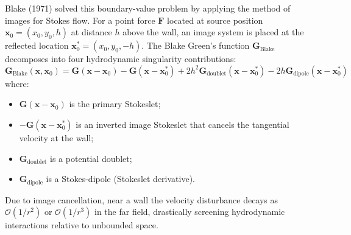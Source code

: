 \documentclass[11pt,a4paper]{article}
\begin{document}
Blake (1971) solved this boundary-value problem by applying the method of images for Stokes flow. For a point force $\mathbf{F}$ located at source position $\mathbf{x}_0 = (x_0, y_0, h)$ at distance $h$ above the wall, an image system is placed at the reflected location $\mathbf{x}_0^* = (x_0, y_0, -h)$. The Blake Green's function $\mathbf{G}_{\text{Blake}}$ decomposes into four hydrodynamic singularity contributions:
\begin{equation}
    \mathbf{G}_{\text{Blake}}(\mathbf{x}, \mathbf{x}_0) = \mathbf{G}(\mathbf{x} - \mathbf{x}_0) - \mathbf{G}(\mathbf{x} - \mathbf{x}_0^*) + 2h^2 \mathbf{G}_{\text{doublet}}(\mathbf{x} - \mathbf{x}_0^*) - 2h \mathbf{G}_{\text{dipole}}(\mathbf{x} - \mathbf{x}_0^*)
\end{equation}
where:
\begin{itemize}
    \item $\mathbf{G}(\mathbf{x} - \mathbf{x}_0)$ is the primary Stokeslet;
    \item $-\mathbf{G}(\mathbf{x} - \mathbf{x}_0^*)$ is an inverted image Stokeslet that cancels the tangential velocity at the wall;
    \item $\mathbf{G}_{\text{doublet}}$ is a potential doublet;
    \item $\mathbf{G}_{\text{dipole}}$ is a Stokes-dipole (Stokeslet derivative).
\end{itemize}
Due to image cancellation, near a wall the velocity disturbance decays as $\mathcal{O}(1/r^2)$ or $\mathcal{O}(1/r^3)$ in the far field, drastically screening hydrodynamic interactions relative to unbounded space.
\end{document}
